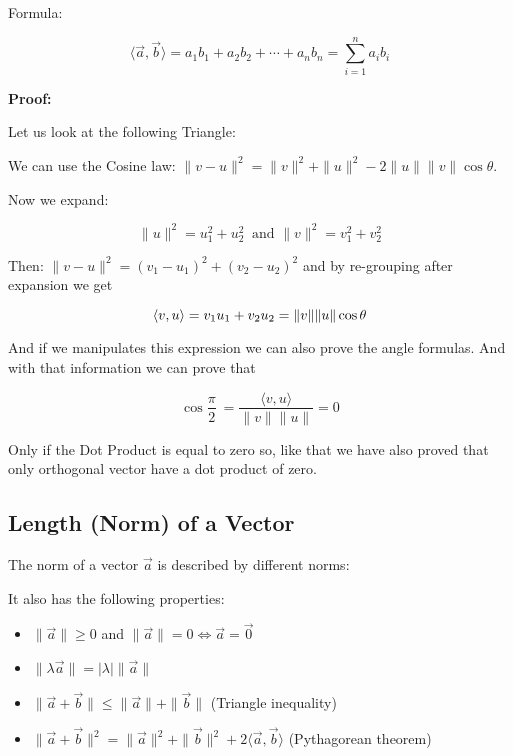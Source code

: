 Formula:

\[
	\langle\vec{a}, \vec{b}\rangle = a_1 b_1 + a_2 b_2 + \cdots + a_n b_n = \sum_{i = 1}^{n} a_i b_i
\]

\textbf{Proof:}

Let us look at the following Triangle:

\begin{center}
\end{center}

We can use the Cosine law: \(\|v - u\|^{2} = \|v\|^2 + \|u\|^2  - 2 \|u\| \|v\| \cos\theta\).

Now we expand:

\[
	\|u\|^2 = u_{1}^2 + u_{2}^2\ \text{ and } \|v\|^2 = v_{1}^2 + v_{2}^2
\]

Then: \(\|v - u\|^2 = {(v_1 - u_1)}^2 + {(v_2 - u_2)}^2\) and by re-grouping after expansion we get

\[
	\langle v, u\rangle = v_1u_1 + v_2u_2 = \|v\|\|u\|\cos \theta \\ 
\]

\QED

And if we manipulates this expression we can also prove the angle formulas.
And with that information we can prove that

\[
	\cos \frac{\pi}{2}\ = \frac{\langle v, u\rangle}{\|v\|\|u\|} = 0
\]

Only if the Dot Product is equal to zero so, like that we have also proved that
only orthogonal vector have a dot product of zero.

\subsection{Length (Norm) of a Vector}

The norm of a vector \(\vec{a}\) is described by different norms:

It also has the following properties:

\begin{itemize}

	\item \(\|\vec{a}\| \geq 0\) and \(\|\vec{a}\| = 0 \Leftrightarrow \vec{a} = \vec{0}\)

	\item \(\|\lambda \vec{a}\| = |\lambda| \|\vec{a}\|\)

	\item \(\|\vec{a} + \vec{b}\| \leq \|\vec{a}\| + \|\vec{b}\|\) (Triangle inequality)

	\item \(\|\vec{a} + \vec{b}\|^2 = \|\vec{a}\|^2 + \|\vec{b}\|^2 + 2\langle\vec{a}, \vec{b}\rangle\) (Pythagorean theorem)

\end{itemize}

